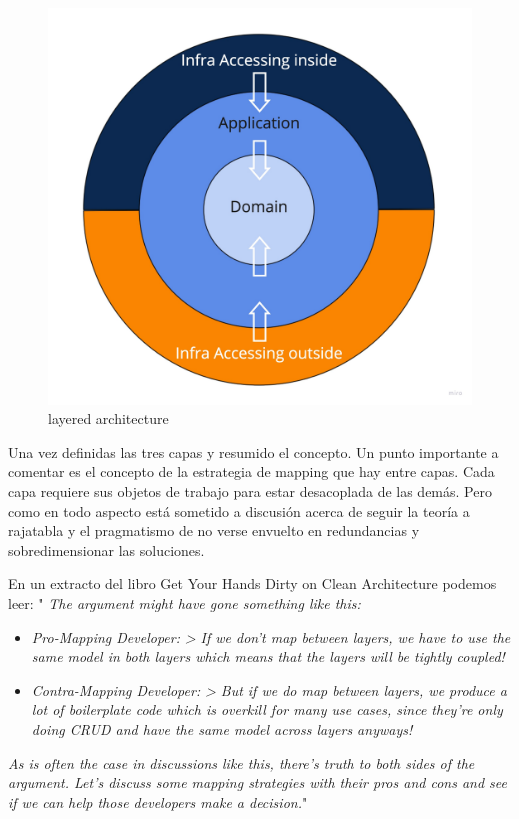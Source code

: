 \begin{figure}[H]
    \centering
    \includegraphics[height=0.3\textheight]{./part/Proyecto_ejecutivo/memoria_descriptiva/infoPreviaAntecedentes/img/PFM - Layer}
    \caption{layered architecture}\label{fig:layers}
\end{figure}

Una vez definidas las tres capas y resumido el concepto. Un punto importante a comentar es el concepto de la estrategia de mapping que hay entre capas. Cada capa requiere sus objetos de trabajo para estar desacoplada de las demás. Pero como en todo aspecto está sometido a discusión acerca de seguir la teoría a rajatabla y el pragmatismo de no verse envuelto en redundancias y sobredimensionar las soluciones.

En un extracto del libro Get Your Hands Dirty on Clean Architecture\cite{TomHombergs2019GYHD} podemos leer:
"\textit{ The argument might have gone something like this:}

\begin{itemize}
    \item \textit{Pro-Mapping Developer:}
    \subitem  \textit{> If we don’t map between layers, we have to use the same model in both layers which means that the layers will be tightly coupled!}
    \item \textit{Contra-Mapping Developer:}
    \subitem \textit{> But if we do map between layers, we produce a lot of boilerplate code which is overkill for many use cases, since they’re only doing CRUD and have the same model across layers anyways!}
\end{itemize}
\textit{As is often the case in discussions like this, there’s truth to both sides of the argument. Let’s discuss some mapping strategies with their pros and cons and see if we can help those developers make a decision.}"

